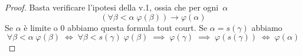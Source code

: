 \begin{proof}
	Basta verificare l'ipotesi della v.1, ossia che per ogni~$\alpha$
	\[ (\forall {\beta < \alpha} \; \varphi(\beta)) \rightarrow \varphi(\alpha)
		\]
	Se $\alpha$ \`e limite o $0$ abbiamo questa formula tout court.
	Se $\alpha = s(\gamma)$ abbiamo
	\[ \forall {\beta < \alpha} \; \varphi(\beta) \;\iff\;
	   \forall {\beta < s(\gamma)} \; \varphi(\beta) \;\implies\;
\varphi(\gamma) \;\implies\; \varphi(s(\gamma)) \;\iff\;
\varphi(\alpha)
		\]
\end{proof}

%
%
%
%
%
%
